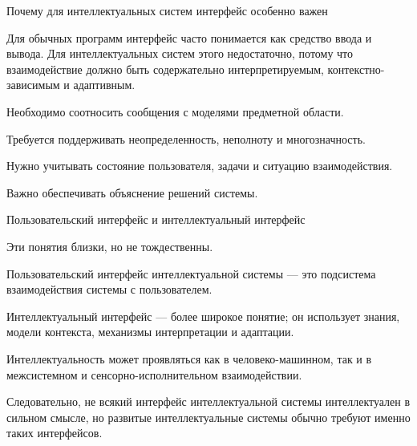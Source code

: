 \begin{frame}{Почему для интеллектуальных систем интерфейс особенно важен}
	\topline
	\justifying

	
	Для обычных программ интерфейс часто понимается как средство ввода и вывода. Для интеллектуальных систем этого недостаточно, потому что взаимодействие должно быть содержательно интерпретируемым, контекстно-зависимым и адаптивным.
	
	\begin{textitemize}
		\item Необходимо соотносить сообщения с моделями предметной области.
		\item Требуется поддерживать неопределенность, неполноту и многозначность.
		\item Нужно учитывать состояние пользователя, задачи и ситуацию взаимодействия.
		\item Важно обеспечивать объяснение решений системы.
	\end{textitemize}
\end{frame}

\begin{frame}{Пользовательский интерфейс и интеллектуальный интерфейс}
	\topline
	\justifying
	
	Эти понятия близки, но не тождественны.
	
	\begin{textitemize}
		\item Пользовательский интерфейс интеллектуальной системы --- это подсистема взаимодействия системы с пользователем.
		\item Интеллектуальный интерфейс --- более широкое понятие; он использует знания, модели контекста, механизмы интерпретации и адаптации.
		\item Интеллектуальность может проявляться как в человеко-машинном, так и в межсистемном и сенсорно-исполнительном взаимодействии.
		\item Следовательно, не всякий интерфейс интеллектуальной системы интеллектуален в сильном смысле, но развитые интеллектуальные системы обычно требуют именно таких интерфейсов.
	\end{textitemize}
\end{frame}

